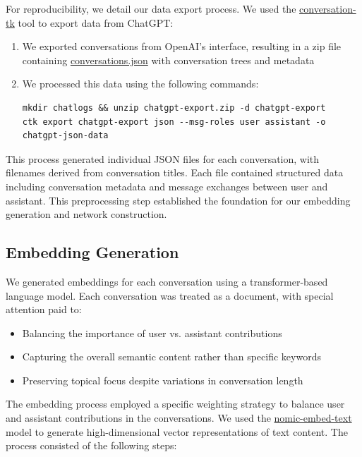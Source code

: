 \documentclass[10pt, a4paper]{article}
\begin{document}
For reproducibility, we detail our data export process. We used the \url{conversation-tk} tool \cite{ctk2024} to export data from ChatGPT:

\begin{enumerate}
    \item We exported conversations from OpenAI's interface, resulting in a zip file containing \url{conversations.json} with conversation trees and metadata
    \item We processed this data using the following commands:
    \begin{lstlisting}[basicstyle=\ttfamily\footnotesize, breaklines=true, breakatwhitespace=true, columns=flexible]
mkdir chatlogs && unzip chatgpt-export.zip -d chatgpt-export
ctk export chatgpt-export json --msg-roles user assistant -o chatgpt-json-data
    \end{lstlisting}
\end{enumerate}

This process generated individual JSON files for each conversation, with filenames derived from conversation titles. Each file contained structured data including conversation metadata and message exchanges between user and assistant. This preprocessing step established the foundation for our embedding generation and network construction.

\subsection{Embedding Generation}

We generated embeddings for each conversation using a transformer-based language model. Each conversation was treated as a document, with special attention paid to:
\begin{itemize}
    \item Balancing the importance of user vs. assistant contributions
    \item Capturing the overall semantic content rather than specific keywords
    \item Preserving topical focus despite variations in conversation length
\end{itemize}

The embedding process employed a specific weighting strategy to balance user and assistant contributions in the conversations. We used the \url{nomic-embed-text} model to generate high-dimensional vector representations of text content. The process consisted of the following steps:
\end{document}
